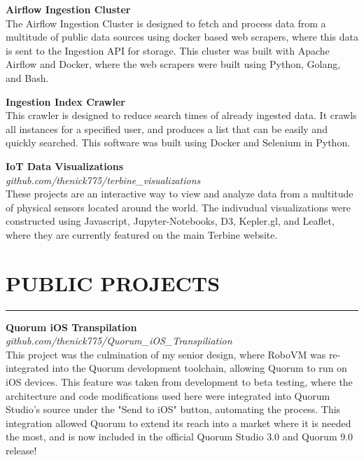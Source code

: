 \documentclass{res}
\begin{document}
\begin{resume}
		{\bf Airflow Ingestion Cluster} \hfill \vspace{5pt} \\
			The Airflow Ingestion Cluster is designed to fetch and process data from a multitude of public data sources using docker based web scrapers, where this data is sent to the Ingestion API for storage. This cluster was built with Apache Airflow and Docker, where the web scrapers were built using Python, Golang, and Bash.
\vspace{-5pt}

		{\bf Ingestion Index Crawler} \hfill \vspace{5pt}\\
			This crawler is designed to reduce search times of already ingested data. It crawls all instances for a specified user, and produces a list that can be easily and quickly searched. This software was built using Docker and Selenium in Python.
\vspace{-5pt}

		{\bf IoT Data Visualizations} \\
    \emph{github.com/thenick775/terbine\_visualizations} \hfill \vspace{4pt}\\
			These projects are an interactive way to view and analyze data from a multitude of physical sensors located around the world. The indivudual visualizations were constructed using Javascript, Jupyter-Notebooks, D3, Kepler.gl, and Leaflet, where they are currently featured on the main Terbine website.

\vspace{-3pt}

		\section{{PUBLIC PROJECTS}}
    \noindent\rule[0.5ex]{\linewidth}{1pt}
		{\bf Quorum iOS Transpilation} \\
			\emph{github.com/thenick775/Quorum\_iOS\_Transpiliation} \hfill \vspace{2.5pt}\\
			This project was the culmination of my senior design, where RoboVM was re-integrated into the Quorum development toolchain, allowing Quorum to run on iOS devices. This feature was taken from development to beta testing, where the architecture and code modifications used here were integrated into Quorum Studio's source under the "Send to iOS" button, automating the process. This integration allowed Quorum to extend its reach into a market where it is needed the most, and is now included in the official Quorum Studio 3.0 and Quorum 9.0 release!
\vspace{-5pt}


\end{resume}
\end{document}
